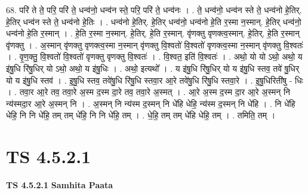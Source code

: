 \documentclass[17pt]{extarticle}
\begin{document}
68. परि॑ ते ते॒ परि॒ परि॑ ते॒ धन्व॑नो॒ धन्व॑न स्ते॒ परि॒ परि॑ ते॒ धन्व॑नः । . ते॒ धन्व॑नो॒ धन्व॑न स्ते ते॒ धन्व॑नो हे॒तिर्. हे॒तिर् धन्व॑न स्ते ते॒ धन्व॑नो हे॒तिः । . धन्व॑नो हे॒तिर्. हे॒तिर् धन्व॑नो॒ धन्व॑नो हे॒ति र॒स्मा न॒स्मान्. हे॒तिर् धन्व॑नो॒ धन्व॑नो हे॒ति र॒स्मान् । . हे॒ति र॒स्मा न॒स्मान्. हे॒तिर्. हे॒ति र॒स्मान्. वृ॑णक्तु वृणक्त्व॒स्मान्. हे॒तिर्. हे॒ति र॒स्मान् वृ॑णक्तु । . अ॒स्मान् वृ॑णक्तु वृणक्त्व॒स्मा न॒स्मान् वृ॑णक्तु वि॒श्वतो॑ वि॒श्वतो॑ वृणक्त्व॒स्मा न॒स्मान् वृ॑णक्तु वि॒श्वतः॑ । . वृ॒ण॒क्तु॒ वि॒श्वतो॑ वि॒श्वतो॑ वृणक्तु वृणक्तु वि॒श्वतः॑ । . वि॒श्वत॒ इति॑ वि॒श्वतः॑ । . अथो॒ यो यो ऽथो॒ अथो॒ य इ॑षु॒धि रि॑षु॒धिर् यो ऽथो॒ अथो॒ य इ॑षु॒धिः । . अथो॒ इत्यथो᳚ । . य इ॑षु॒धि रि॑षु॒धिर् यो य इ॑षु॒धि स्तव॒ तवे॑ षु॒धिर् यो य इ॑षु॒धि स्तव॑ । . इ॒षु॒धि स्तव॒ तवे॑षु॒धि रि॑षु॒धि स्तवा॒र आ॒रे तवे॑षु॒धि रि॑षु॒धि स्तवा॒रे । . इ॒षु॒धिरिती॑षु - धिः । . तवा॒र आ॒रे तव॒ तवा॒रे अ॒स्म द॒स्म दा॒रे तव॒ तवा॒रे अ॒स्मत् । . आ॒रे अ॒स्म द॒स्म दा॒र आ॒रे अ॒स्मन् नि न्य॑स्मदा॒र आ॒रे अ॒स्मन् नि । . अ॒स्मन् नि न्य॑स्म द॒स्मन् नि धे॑हि धेहि॒ न्य॑स्म द॒स्मन् नि धे॑हि । . नि धे॑हि धेहि॒ नि नि धे॑हि॒ तम् तम् धे॑हि॒ नि नि धे॑हि॒ तम् । . धे॒हि॒ तम् तम् धे॑हि धेहि॒ तम् । . तमिति॒ तम् । \newline
\pagebreak
{}

\section{ TS 4.5.2.1 }

\textbf{TS 4.5.2.1 } \newline
\textbf{Samhita Paata} \newline
\end{document}
